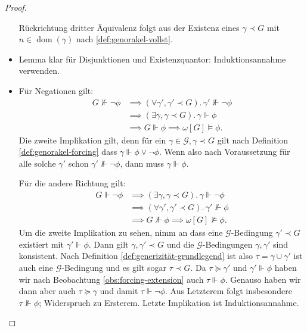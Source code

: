 \documentclass[nofonts]{uebung}
\theoremstyle{definition}
\DeclareMathOperator{\dom}{dom}
\begin{document}
\begin{proof}
\begin{itemize}
            Rückrichtung dritter Äquivalenz folgt aus der Existenz eines $\gamma\prec G$ mit $n\in\dom(\gamma)$ nach \ref{def:genorakel-vollst}.
        \item Lemma klar für Disjunktionen und Existenzquantor: Induktionsannahme verwenden.
        \item Für Negationen gilt: 
            \begin{align*}
                G\not\Vdash \neg\phi &\implies (\forall \gamma', \gamma'\prec G).\,\gamma'\not\Vdash \neg\phi\\
                                     &\implies (\exists \gamma, \gamma\prec G).\,\gamma\Vdash \phi\\
                                     &\implies G\Vdash\phi \implies \omega[G]\vDash \phi.
            \end{align*}
            Die zweite Implikation gilt, denn für ein $\gamma\in \mathcal G, \gamma\prec G$ gilt nach Definition \ref{def:genorakel-forcing} dass $\gamma\Vdash \phi\lor \neg \phi$.
            Wenn also nach Voraussetzung für alle solche $\gamma'$ schon $\gamma'\not\Vdash \neg\phi$, dann muss $\gamma\Vdash \phi$.

            Für die andere Richtung gilt:
            \begin{align*}
                G\Vdash \neg\phi &\implies (\exists \gamma, \gamma\prec G).\,\gamma\Vdash \neg\phi\\
                                     &\implies (\forall \gamma', \gamma'\prec G).\,\gamma'\not\Vdash \phi\\
                                     &\implies G\not\Vdash\phi \implies \omega[G]\not\vDash \phi.
            \end{align*}
            Um die zweite Implikation zu sehen, nimm an dass eine $\mathcal G$-Bedingung $\gamma'\prec G$ existiert mit $\gamma'\Vdash\phi$.
            Dann gilt $\gamma, \gamma'\prec G$ und die $\mathcal G$-Bedingungen $\gamma, \gamma'$ sind konsistent.
            Nach Definition \ref{def:generizität-grundlegend} ist also $\tau=\gamma\cup \gamma'$ ist auch eine $\mathcal G$-Bedingung und es gilt sogar $\tau\prec G$.
            Da $\tau\succeq\gamma'$ und $\gamma'\Vdash\phi$ haben wir nach Beobachtung \ref{obs:forcing-extension} auch $\tau\Vdash\phi$.
            Genauso haben wir dann aber auch $\tau\succeq\gamma$ und damit $\tau\Vdash \neg\phi$. Aus Letzterem folgt insbesondere $\tau\not\Vdash\phi$; Widerspruch zu Ersterem. Letzte Implikation ist Induktionsannahme. \qedhere
    \end{itemize}
\end{proof}
\end{document}
